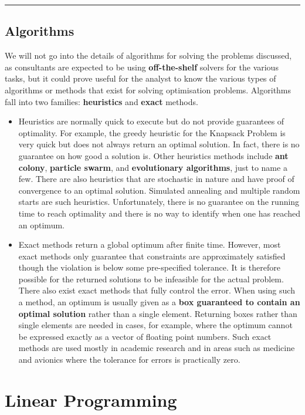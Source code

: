 \begin{center}\rule{0.5\linewidth}{.4pt}\end{center}

\subsection{Algorithms}
We will not go into the details of algorithms for solving the
problems discussed, as consultants are expected to be using \textbf{off-the-shelf}
solvers for the various tasks, but it could prove useful for the analyst to know the 
various types of algorithms or methods that exist for solving
optimisation problems.
\newl Algorithms fall into two families: \textbf{heuristics} and \textbf{exact} methods.\begin{itemize}[noitemsep]
\item Heuristics are normally quick to execute but do not provide guarantees
of optimality. For example, the greedy heuristic for the Knapsack
Problem is very quick but does not always return an optimal solution. In
fact, there is no guarantee on how good a solution is. Other heuristics
methods include \textbf{ant colony}, \textbf{particle swarm}, and \textbf{evolutionary algorithms},
just to name a few. There are also heuristics that are stochastic in
nature and have proof of convergence to an optimal solution. Simulated
annealing and multiple random starts are such heuristics. Unfortunately,
there is no guarantee on the running time to reach optimality and there
is no way to identify when one has reached an optimum.
\item Exact methods return a global optimum after finite time. However, most
exact methods only guarantee that constraints are approximately
satisfied though the violation is below some pre-specified tolerance. It
is therefore possible for the returned solutions to be infeasible for
the actual problem. There also exist exact methods that fully control
the error. When using such a method, an optimum is usually given as a
\textbf{box guaranteed to contain an optimal solution} rather than a single
element. Returning boxes rather than single elements are needed in
cases, for example, where the optimum cannot be expressed exactly as a
vector of floating point numbers. Such exact methods are used mostly in
academic research and in areas such as medicine and avionics where the
tolerance for errors is practically zero.
\end{itemize}

\section{Linear Programming}

